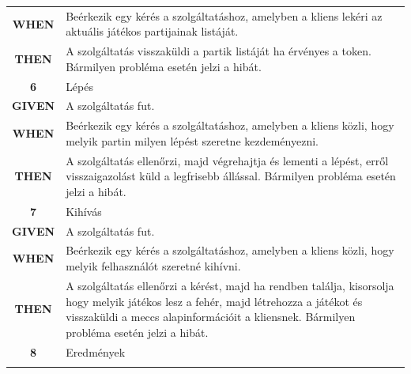 \documentclass[twoside, a4paper, 12pt]{article}
\begin{document}
\begin{longtable}[c]{|c|p{14cm}|}
	\textbf{WHEN} &
	Beérkezik egy kérés a szolgáltatáshoz, amelyben a kliens lekéri az aktuális játékos partijainak listáját.
	\\
	\nobreakhline
	
	\textbf{THEN} &
	A szolgáltatás visszaküldi a partik listáját ha érvényes a token.
	Bármilyen probléma esetén jelzi a hibát.
	\\
	\hline
	
	
	\rowcolor[HTML]{CBCEFB} 
	\textbf{6}
	&	Lépés
	\\ \nobreakhline
	
	\textbf{GIVEN} &
	A szolgáltatás fut.
	\\ \nobreakhline
	
	\textbf{WHEN} &
	Beérkezik egy kérés a szolgáltatáshoz, amelyben a kliens közli, hogy melyik partin milyen lépést szeretne kezdeményezni.
	\\
	\nobreakhline
	
	\textbf{THEN} &
	A szolgáltatás ellenőrzi, majd végrehajtja és lementi a lépést, erről visszaigazolást küld a legfrisebb állással.
	Bármilyen probléma esetén jelzi a hibát.
	\\
	\hline
	
	
	\rowcolor[HTML]{CBCEFB} 
	\textbf{7}
	&	Kihívás
	\\ \nobreakhline
	
	\textbf{GIVEN} &
	A szolgáltatás fut.
	\\ \nobreakhline
	
	\textbf{WHEN} &
	Beérkezik egy kérés a szolgáltatáshoz, amelyben a kliens közli, hogy melyik felhasználót szeretné kihívni.
	\\
	\nobreakhline
	
	\textbf{THEN} &
	A szolgáltatás ellenőrzi a kérést, majd ha rendben találja, kisorsolja hogy melyik játékos lesz a fehér, majd létrehozza a játékot és visszaküldi a meccs alapinformációit a kliensnek.
	Bármilyen probléma esetén jelzi a hibát.
	\\
	\hline
	
	
	\rowcolor[HTML]{CBCEFB} 
	\textbf{8}
	&	Eredmények
	\\ \nobreakhline
	

\end{longtable}
\end{document}
